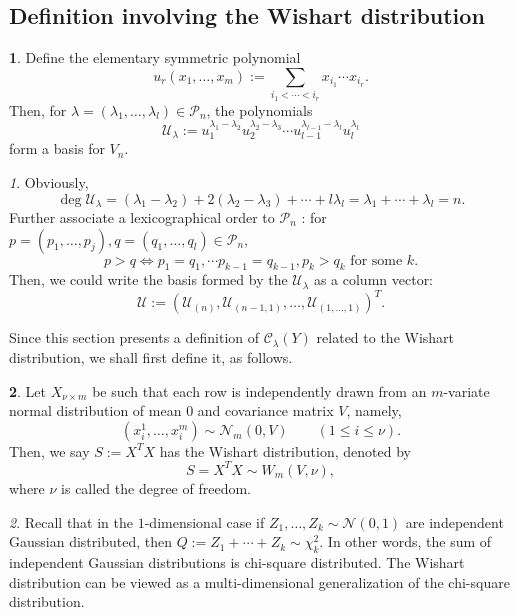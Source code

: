 \documentclass[10pt,oneside,american]{amsart}
\numberwithin{equation}{section}
\numberwithin{figure}{section}
\theoremstyle{definition}
\newtheorem{defn}{\protect\definitionname}[section]
\theoremstyle{remark}
\newtheorem{rem}{\protect\remarkname}[section]
\theoremstyle{plain}
\theoremstyle{definition}
\theoremstyle{plain}
\theoremstyle{plain}
\theoremstyle{plain}
\providecommand{\definitionname}{Definition}
\providecommand{\remarkname}{Remark}
\begin{document}
\subsection{Definition involving the Wishart distribution}
\begin{defn}
Define the elementary symmetric polynomial \cite[pp.~12, eq.~9]{Takemura}
\[
u_{r}(x_{1},\ldots,x_{m}):=\underset{i_{1}<\cdots<i_{r}}{\sum}x_{i_{1}}\cdots x_{i_{r}}.
\]
Then, for $\lambda=\left(\lambda_{1},\ldots,\lambda_{l}\right)\in\mathcal{P}_{n}$,
the polynomials \cite[pp.~12, eq.~10]{Takemura}
\[
\mathcal{U}_{\lambda}:=u_{1}^{\lambda_{1}-\lambda_{2}}u_{2}^{\lambda_{2}-\lambda_{3}}\cdots u_{l-1}^{\lambda_{l-1}-\lambda_{l}}u_{l}^{\lambda_{l}}
\]
\cite[pp.~13]{Takemura} form a basis for $V_{n}$.
\end{defn}
\begin{rem}
Obviously, 
\[
\deg\mathcal{U}_{\lambda}=\left(\lambda_{1}-\lambda_{2}\right)+2\left(\lambda_{2}-\lambda_{3}\right)+\cdots+l\lambda_{l}=\lambda_{1}+\cdots+\lambda_{l}=n.
\]
Further associate a lexicographical order to $\mathcal{P}_{n}$ \cite[pp.~9, eq.~7]{Takemura}:
for $p=\left(p_{1},\ldots,p_{j}\right),q=\left(q_{1},\ldots,q_{l}\right)\in\mathcal{P}_{n}$,
\[
p>q\Leftrightarrow p_{1}=q_{1},\cdots p_{k-1}=q_{k-1},p_{k}>q_{k}\text{ for some }k.
\]
Then, we could write the basis formed by the $\mathcal{U}_{\lambda}$
as a column vector:
\[
\mathcal{U}:=\left(\mathcal{U}_{\left(n\right)},\mathcal{U}_{\left(n-1,1\right)},\ldots,\mathcal{U}_{\left(1,\ldots,1\right)}\right)^{T}.
\]
\end{rem}
Since this section presents a definition of $\mathcal{C}_{\lambda}(Y)$
related to the Wishart distribution, we shall first define it, as follows.
\begin{defn}
Let $X_{\nu\times m}$ be such that each row is independently drawn
from an $m$-variate normal distribution of mean $0$ and covariance
matrix $V$, namely, 
\[
  \left(x_{i}^{1},\ldots,x_{i}^{m}\right)\sim\mathcal{N}_{m}(0,V)
  \qquad (1\leq i\leq\nu).
\]
Then, we say $S:=X^{T}X$ has the Wishart distribution, denoted by
\[
S=X^{T}X\sim W_{m}(V,\nu),
\]
where $\nu$ is called the degree of freedom.
\end{defn}
\begin{rem}
Recall that in the $1$-dimensional case if $Z_{1},\ldots,Z_{k}\sim\mathcal{N}(0,1)$
are independent Gaussian distributed, then $Q:=Z_{1}+\cdots+Z_{k}\sim\chi_{k}^{2}$.
In other words, the sum of independent Gaussian distributions is chi-square
distributed. The Wishart distribution can be viewed as a multi-dimensional
generalization of the chi-square distribution.
\end{rem}
\end{document}
